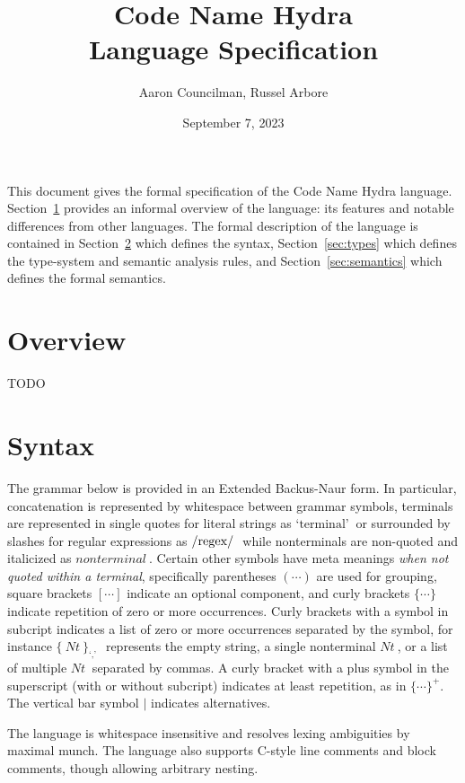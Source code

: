 \documentclass[letterpaper]{article}
\title{Code Name Hydra \\ \large Language Specification}
\author{Aaron Councilman, Russel Arbore}
\date{September 7, 2023}
\newcommand{\nonterminal}[1]{#1\ }
\newcommand{\terminal}[1]{\text{`#1'}\ }
\newcommand{\regex}[1]{\text{\lstinline$/#1/$}\ }
\newcommand*{\gramRepeat}[2][]{\{\ #2\}_{#1}\ }
\begin{document}
\maketitle

This document gives the formal specification of the Code Name Hydra language.
Section~\ref{sec:overview} provides an informal overview of the language: its features and notable differences from other languages.
The formal description of the language is contained in Section~\ref{sec:syntax} which defines the syntax, Section~\ref{sec:types} which defines the type-system and semantic analysis rules, and Section~\ref{sec:semantics} which defines the formal semantics.

\section{Overview}\label{sec:overview}
TODO

\section{Syntax}\label{sec:syntax}
The grammar below is provided in an Extended Backus-Naur form.
In particular, concatenation is represented by whitespace between grammar symbols, terminals are represented in single quotes for literal strings as $\terminal{terminal}$ or surrounded by slashes for regular expressions as $\regex{regex}$ while nonterminals are non-quoted and italicized as $\nonterminal{nonterminal}$.
Certain other symbols have meta meanings \emph{when not quoted within a terminal}, specifically parentheses $(\cdots)$ are used for grouping, square brackets $[\cdots]$ indicate an optional component, and curly brackets $\{ \cdots \}$ indicate repetition of zero or more occurrences.
Curly brackets with a symbol in subcript indicates a list of zero or more occurrences separated by the symbol, for instance $\gramRepeat[\terminal{,}]{\nonterminal{Nt}}$ represents the empty string, a single nonterminal $\nonterminal{Nt}$, or a list of multiple $\nonterminal{Nt}$ separated by commas.
A curly bracket with a plus symbol in the superscript (with or without subcript) indicates at least repetition, as in $\{ \cdots \}^{+}$.
The vertical bar symbol $\mid$ indicates alternatives.

The language is whitespace insensitive and resolves lexing ambiguities by maximal munch.
The language also supports C-style line comments and block comments, though allowing arbitrary nesting.
\end{document}
